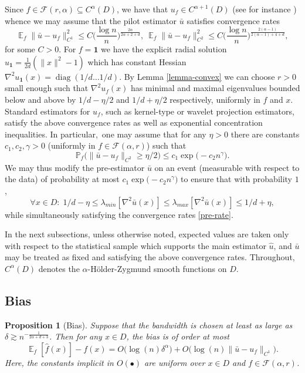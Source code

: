 \documentclass{article}
\numberwithin{equation}{section}
\newtheorem{proposition}[satz]{Proposition}
\theoremstyle{definition}
\DeclareMathOperator{\E}{{\mathbb E}}
\DeclareMathOperator{\diag}{diag} \DeclareMathOperator{\KL}{KL}
\renewcommand{\cdot}{{\scriptstyle \bullet} }
\renewcommand{\le}{\leqslant}
\renewcommand{\ge}{\geqslant}
\begin{document}
Since $f\in \mathcal F(r,\alpha)\subseteq C^\alpha(D)$, we have that $u_f\in C^{\alpha+1}(D)$ (see for instance \cite{nickl2020convergence}) whence we may assume that the pilot estimator $\bar u$ satisfies convergence rates
\begin{equation}\label{pre-rate}
    \E_f \|\bar u - u_f\|_{C^1}^2\le C\big(\frac{\log n}{n}\big)^{\frac{2\alpha}{2\alpha +2 +d}},~\E_f \|\bar u - u_f\|_{C^2}^2\le C\big(\frac{\log n}{n}\big)^{\frac{2(\alpha-1)}{2(\alpha-1) +4 +d}},
\end{equation}
for some $C>0$. For $f=\textbf{1}$ we have the explicit radial solution $u_{\mathbf 1} = \frac 1{2d} (\|x\|^2-1)$ which has constant Hessian $ \nabla^2u_{\mathbf 1}(x)= \diag(1/d \dots 1/d )$. By Lemma \ref{lemma-convex} we can choose $r>0$ small enough such that $\nabla^2 u_{ f}(x)$ has minimal and maximal eigenvalues bounded below and above  by $1/d-\eta/2$ and $1/d+\eta/2$ respectively, uniformly in $f$ and $x$. Standard estimators for $u_f$, such as kernel-type or wavelet projection estimators, satisfy the above convergence rates as well as exponential concentration inequalities. In particular,~one may assume that for any $\eta>0$ there are constants $c_1,c_2,\gamma >0$ (uniformly in $f\in \mathcal F(\alpha,r)$) such that
\[ \mathbb P_f\big(\|\bar u- u_f\|_{C^2} \ge \eta /2 \big) \le c_1\exp\big(-c_2n^\gamma \big). \]
We may thus modify the pre-estimator $\bar u$ on an event (measurable with respect to the data) of probability at most $c_1\exp\big(-c_2n^\gamma \big)$ to ensure that with probability $1$,
\[\forall x\in D:\;  1/d-\eta \le \lambda_{min}[\nabla^2\bar u (x)] \le \lambda_{max}[\nabla^2 \bar u (x)] \le 1/d+\eta, \]
while simultaneously satisfying the convergence rates \eqref{pre-rate}.


In the next subsections, unless otherwise noted, expected values  are taken only with respect to the statistical sample which supports the main estimator $\hat u$, and $\bar u$ may be treated as fixed and satisfying the above convergence rates. Throughout, $C^\alpha(D)$ denotes the $\alpha$-H\"older-Zygmund smooth functions on $D$.


\subsection{Bias}

\begin{proposition}[Bias] Suppose that the bandwidth is chosen at least as large as $\delta\gtrsim n^{-\frac{1}{2\alpha+d+3}}$. Then for any $x\in D$, the bias is of order at most
\[  \E_f[ \hat f(x) ]- f(x) = O\big(\log (n) \delta^\alpha\big) + O\big(\log (n)\|\bar u-u_f\|_{C^1}\big).\]
Here, the constants implicit in $O(\cdot)$ are uniform over $x\in D$ and $f\in \mathcal F(\alpha,r)$.
\end{proposition}
\end{document}
